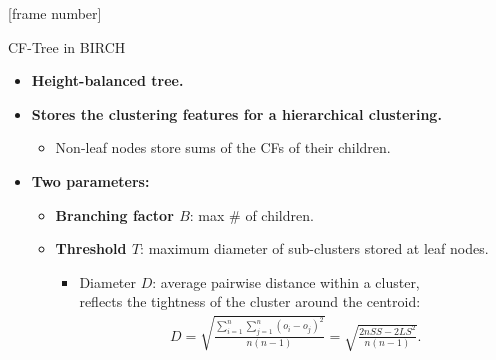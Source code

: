 \documentclass[aspectratio=169,t,xcolor=dvipsnames]{beamer}
\begin{document}
  { %
    [frame number]
    \begin{frame}{CF-Tree in BIRCH}
      \begin{itemize}
        \item \textbf{Height-balanced tree.}
        \item \textbf{Stores the clustering features for a hierarchical clustering.}
        \begin{itemize}
          \item Non-leaf nodes store sums of the CFs of their children.
        \end{itemize}
        \item \textbf{Two parameters:}
        \begin{itemize}
          \item \textbf{\color{airforceblue}Branching factor $B$}: max \# of children.
          \item \textbf{\color{airforceblue}Threshold $T$}: maximum diameter of sub-clusters stored at leaf nodes.
          \begin{itemize}
            \item Diameter $D$: average pairwise distance within a cluster, \\
            reflects the tightness of the cluster around the centroid:
            \begin{align}
              D = \sqrt{\frac{\sum_{i=1}^{n} \sum_{j=1}^{n} (o_i-o_j)^2}{n(n-1)}} = \sqrt{\frac{2nSS - 2LS^2}{n(n-1)}}.
            \end{align}
          \end{itemize}
        \end{itemize}
      \end{itemize}
    \end{frame}
  }
\end{document}
